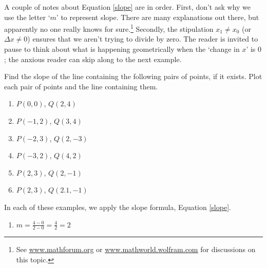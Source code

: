 \documentclass{ximera}
\begin{document}
A couple of notes about Equation \ref{slope} are in order.  First, don't ask why we use the letter `$m$' to represent slope.  There are many explanations out there, but apparently no one really knows for sure.\footnote{See  \href{http://mathforum.org/dr.math/faq/faq.terms.html}{\underline{www.mathforum.org}} or \href{http://mathworld.wolfram.com/Slope.html}{\underline{www.mathworld.wolfram.com}} for discussions on this topic.} Secondly, the stipulation  $x_1 \neq x_0$ (or $\Delta x \neq 0$) ensures that we aren't trying to divide by zero.  The reader is invited to pause to think about what is happening geometrically when the `change in $x$' is $0$; the anxious reader can skip along to the next example.

\begin{example}  Find the slope of the line containing the following pairs of points, if it exists.  Plot each pair of points and the line containing them.


\begin{enumerate}

\item  $P(0,0)$, $Q(2,4)$
\item  $P(-1,2)$, $Q(3,4)$

\item  $P(-2,3)$, $Q(2,-3)$
\item  $P(-3,2)$, $Q(4,2)$


\item  $P(2,3)$, $Q(2,-1)$
\item  $P(2,3)$, $Q(2.1, -1)$

\end{enumerate}

\begin{explanation}
In each of these examples, we apply the slope formula, Equation \ref{slope}.

\begin{enumerate}

\item   

$m = \frac{4-0}{2-0} = \frac{4}{2} = 2$


\end{enumerate}
\end{explanation}
\end{example}
\end{document}
